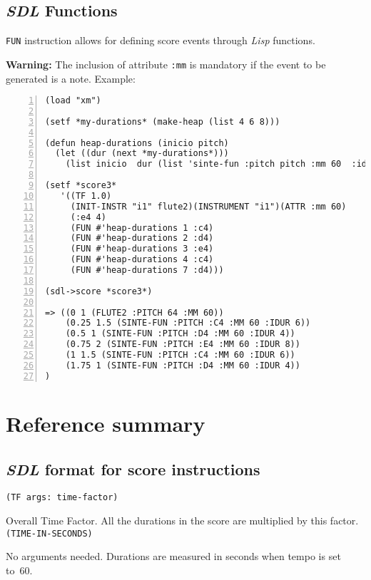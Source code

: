 \subsection{\textit{SDL} Functions}
\texttt{FUN} instruction allows for defining score events through \textit{Lisp} functions. \par
\textbf{Warning:} The inclusion of attribute \texttt{:mm} is mandatory if the event to be generated  is a note. Example:
\begin{Verbatim}[frame=single,fontsize=\small,numbers=left,numbersep=2mm,
                 commandchars=+\[\]]
(load "xm") 

(setf *my-durations* (make-heap (list 4 6 8)))

(defun heap-durations (inicio pitch)
  (let ((dur (next *my-durations*)))
    (list inicio  dur (list 'sinte-fun :pitch pitch :mm 60  :idur dur))))

(setf *score3*
   '((TF 1.0)
     (INIT-INSTR "i1" flute2)(INSTRUMENT "i1")(ATTR :mm 60)
     (:e4 4)
     (FUN #'heap-durations 1 :c4)
     (FUN #'heap-durations 2 :d4)
     (FUN #'heap-durations 3 :e4)
     (FUN #'heap-durations 4 :c4)
     (FUN #'heap-durations 7 :d4)))

(sdl->score *score3*)

=> ((0 1 (FLUTE2 :PITCH 64 :MM 60))
    (0.25 1.5 (SINTE-FUN :PITCH :C4 :MM 60 :IDUR 6))
    (0.5 1 (SINTE-FUN :PITCH :D4 :MM 60 :IDUR 4))
    (0.75 2 (SINTE-FUN :PITCH :E4 :MM 60 :IDUR 8))
    (1 1.5 (SINTE-FUN :PITCH :C4 :MM 60 :IDUR 6))
    (1.75 1 (SINTE-FUN :PITCH :D4 :MM 60 :IDUR 4))
)
\end{Verbatim}

\section{Reference summary}
\subsection{\textit{SDL} format for score instructions}

\noindent\texttt{(TF args: time-factor)} \par
Overall Time Factor. All the durations in the score are multiplied by this factor.\\

\noindent\texttt{(TIME-IN-SECONDS)}\par
No arguments needed. Durations are measured in seconds when tempo is set to~60.\\

